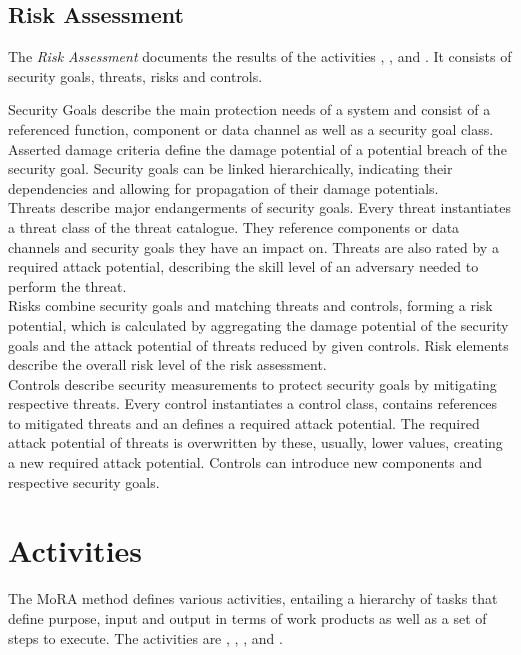 \subsection{Risk Assessment}
\label{moraassessment}

The \textit{Risk Assessment} documents the results of the activities \textit{}, \textit{}, \textit{} and \textit{}. It consists of security goals, threats, risks and controls.

Security Goals describe the main protection needs of a system and consist of a referenced function, component or data channel as well as a security goal class. Asserted damage criteria define the damage potential of a potential breach of the security goal. Security goals can be linked hierarchically, indicating their dependencies and allowing for propagation of their damage potentials.\\
Threats describe major endangerments of security goals. Every threat instantiates a threat class of the threat catalogue. They reference components or data channels and security goals they have an impact on. Threats are also rated by a required attack potential, describing the skill level of an adversary needed to perform the threat. \\
Risks combine security goals and matching threats and controls, forming a risk potential, which is calculated by aggregating the damage potential of the security goals and the attack potential of threats reduced by given controls. Risk elements describe the overall risk level of the risk assessment.\\
Controls describe security measurements to protect security goals by mitigating respective threats. Every control instantiates a control class, contains references to mitigated threats and an defines a required attack potential. The required attack potential of threats is overwritten by these, usually, lower values, creating a new required attack potential. Controls can introduce new components and respective security goals.


\section{Activities}
\label{moraactivities}

The MoRA method defines various activities, entailing a hierarchy of tasks that define purpose, input and output in terms of work products as well as a set of steps to execute. The activities are \textit{}, \textit{}, \textit{}, \textit{} and \textit{}.

